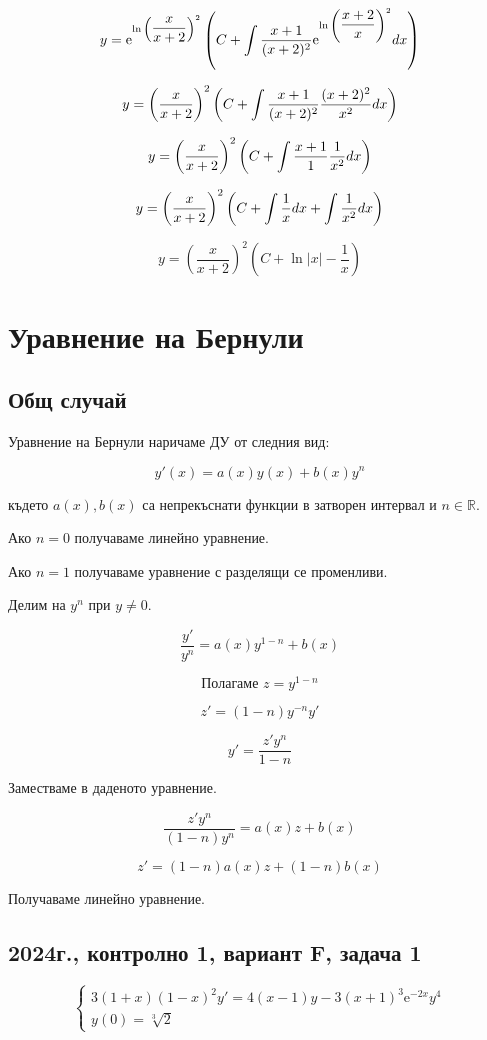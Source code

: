 \documentclass{scrartcl}
\begin{document}
$$y = \mathrm{e}^{\ln{\left(\dfrac{x}{x+2}\right)^2}}\left(C+\int\dfrac{x+1}{(x+2)^2}\mathrm{e}^{\ln{\left(\dfrac{x+2}{x}\right)^2}}\space dx\right)$$

$$y = \left(\dfrac{x}{x+2}\right)^2\left(C+\int\dfrac{x+1}{(x+2)^2}{\dfrac{(x+2)^2}{x^2}}\space dx\right)$$

$$y = \left(\dfrac{x}{x+2}\right)^2\left(C+\int\dfrac{x+1}{1}{\dfrac{1}{x^2}}\space dx\right)$$

$$y = \left(\dfrac{x}{x+2}\right)^2\left(C+\int\dfrac{1}{x}\space dx + \int\dfrac{1}{x^2}\space dx\right)$$

$$y = \left(\dfrac{x}{x+2}\right)^2\left(C+\ln{|x|}-\dfrac{1}{x}\right)$$

\section{Уравнение на Бернули}

\subsection{Общ случай}

Уравнение на Бернули наричаме ДУ от следния вид:

$$y'(x) = a(x)y(x) + b(x)y^n$$

където $a(x), b(x)$ са непрекъснати функции в затворен интервал и $n \in \mathbb{R}$.

Ако $n = 0$ получаваме линейно уравнение.

Ако $n = 1$ получаваме уравнение с разделящи се променливи.

Делим на $y^n$ при $y \ne 0$.

$$\dfrac{y'}{y^n} = a(x)y^{1-n}+b(x)$$

$$\text{Полагаме } z = y^{1-n}$$

$$z' = (1-n)y^{-n}y'$$

$$y' = \dfrac{z'y^n}{1-n}$$

Заместваме в даденото уравнение.

$$\dfrac{z'y^n}{(1-n)y^n} = a(x)z+b(x)$$

$$z' = (1-n)a(x)z+(1-n)b(x)$$

Получаваме линейно уравнение.

\subsection{2024г., контролно 1, вариант F, задача 1}

$$
\begin{cases}
3(1+x)(1-x)^2y' = 4(x-1)y - 3(x+1)^3\mathrm{e}^{-2x}y^4\\
y(0) = \sqrt[3]{2}
\end{cases}
$$
\end{document}
